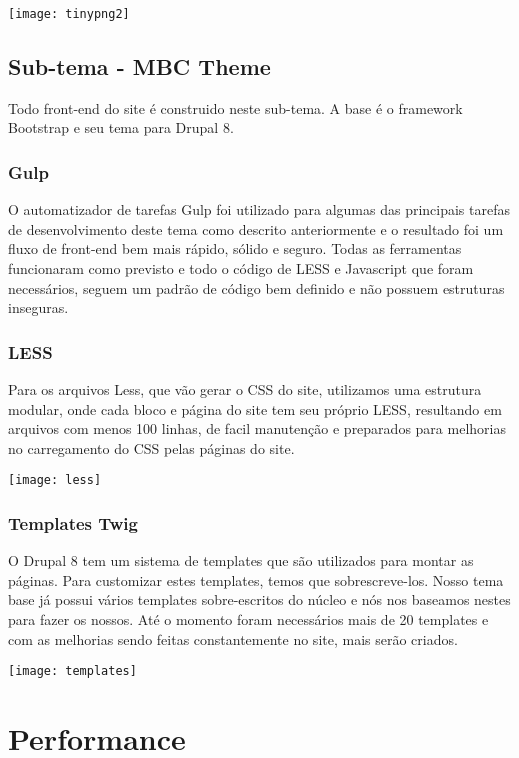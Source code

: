 \texttt{[image: tinypng2]}

\subsection{Sub-tema - MBC Theme}
Todo front-end do site é construido neste sub-tema. A base é o framework Bootstrap e seu tema para Drupal 8. 

\subsubsection{Gulp}
O automatizador de tarefas Gulp foi utilizado para algumas das principais tarefas de desenvolvimento deste tema como descrito anteriormente e o resultado foi um fluxo de front-end bem mais rápido, sólido e seguro. Todas as ferramentas funcionaram como previsto e todo o código de LESS e Javascript que foram necessários, seguem um padrão de código bem definido e não possuem estruturas inseguras.

\subsubsection{LESS}
Para os arquivos Less, que vão gerar o CSS do site, utilizamos uma estrutura modular, onde cada bloco e página do site tem seu próprio LESS, resultando em arquivos com menos 100 linhas, de facil manutenção e preparados para melhorias no carregamento do CSS pelas páginas do site.

\texttt{[image: less]}

\subsubsection{Templates Twig}
O Drupal 8 tem um sistema de templates que são utilizados para montar as páginas. Para customizar estes templates, temos que sobrescreve-los. Nosso tema base já possui vários templates sobre-escritos do núcleo e nós nos baseamos nestes para fazer os nossos. Até o momento foram necessários mais de 20 templates e com as melhorias sendo feitas constantemente no site, mais serão criados.

\texttt{[image: templates]}

\section{Performance}

